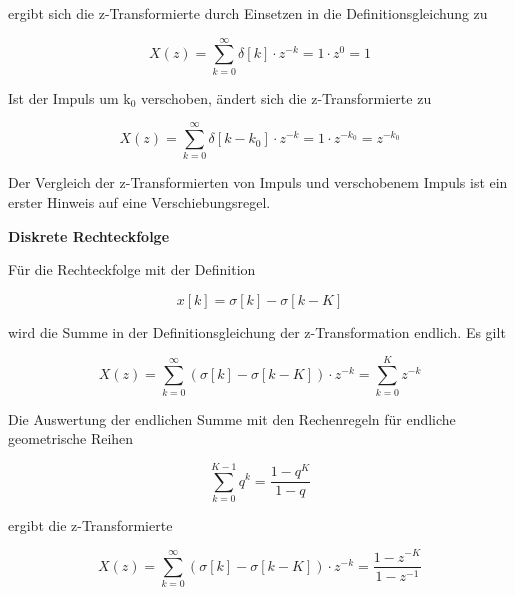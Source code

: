 \noindent ergibt sich die z-Transformierte durch Einsetzen in die Definitionsgleichung zu

\begin{equation}\label{eq:fiveten}
X\left(z\right)=\sum _{k=0}^{\infty }\delta \left[k\right]\cdot z^{-k}  =1\cdot z^{0} =1
\end{equation}

\noindent Ist der Impuls um k${}_{0}$ verschoben, \"{a}ndert sich die z-Transformierte zu

\begin{equation}\label{eq:fiveeleven}
X\left(z\right)=\sum _{k=0}^{\infty }\delta \left[k-k_{0} \right]\cdot z^{-k}  =1\cdot z^{-k_{0} } =z^{-k_{0} }
\end{equation}

\noindent Der Vergleich der z-Transformierten von Impuls und verschobenem Impuls ist ein erster Hinweis auf eine Verschiebungsregel.\bigskip

{\selectfont
\noindent\textbf{Diskrete Rechteckfolge}}\smallskip

\noindent F\"{u}r die Rechteckfolge mit der Definition 

\begin{equation}\label{eq:fivetwelve}
x\left[k\right]=\sigma \left[k\right]-\sigma \left[k-K\right]
\end{equation}

\noindent wird die Summe in der Definitionsgleichung der z-Transformation endlich. Es gilt

\begin{equation}\label{eq:fivethirteen}
X\left(z\right)=\sum _{k=0}^{\infty }\left(\sigma \left[k\right]-\sigma \left[k-K\right]\right)\cdot z^{-k}  =\sum _{k=0}^{K}z^{-k}
\end{equation}

\noindent Die Auswertung der endlichen Summe mit den Rechenregeln f\"{u}r endliche geometrische Reihen 

\begin{equation}\label{eq:fivefourteen}
\sum _{k=0}^{K-1}q^{k}  =\frac{1-q^{K} }{1-q}
\end{equation}

\noindent ergibt die z-Transformierte

\begin{equation}\label{eq:fivefifteen}
X\left(z\right)=\sum _{k=0}^{\infty }\left(\sigma \left[k\right]-\sigma \left[k-K\right]\right)\cdot z^{-k}  =\frac{1-z^{-K} }{1-z^{-1} } 
\end{equation}

